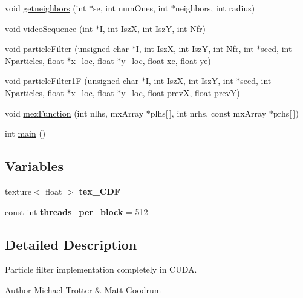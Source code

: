 \begin{DoxyCompactItemize}
\item 
void \hyperlink{ex__particle__CUDA__float_8cu_a0c00166a71eba29cbfd8caf24c68c0d5}{getneighbors} (int $\ast$se, int numOnes, int $\ast$neighbors, int radius)
\item 
void \hyperlink{ex__particle__CUDA__float_8cu_a675031ba0ebec137152999f4d153261e}{videoSequence} (int $\ast$I, int IszX, int IszY, int Nfr)
\item 
void \hyperlink{ex__particle__CUDA__float_8cu_a05ed124716b895cf81222aee197d181d}{particleFilter} (unsigned char $\ast$I, int IszX, int IszY, int Nfr, int $\ast$seed, int Nparticles, float $\ast$x\_\-loc, float $\ast$y\_\-loc, float xe, float ye)
\item 
void \hyperlink{ex__particle__CUDA__float_8cu_a6974c54bae46bd8f7e20eb89a5c73189}{particleFilter1F} (unsigned char $\ast$I, int IszX, int IszY, int $\ast$seed, int Nparticles, float $\ast$x\_\-loc, float $\ast$y\_\-loc, float prevX, float prevY)
\item 
void \hyperlink{ex__particle__CUDA__float_8cu_a6a215cbfde54f82a3ce599228fc3fce5}{mexFunction} (int nlhs, mxArray $\ast$plhs\mbox{[}$\,$\mbox{]}, int nrhs, const mxArray $\ast$prhs\mbox{[}$\,$\mbox{]})
\item 
int \hyperlink{ex__particle__CUDA__float_8cu_ae66f6b31b5ad750f1fe042a706a4e3d4}{main} ()
\end{DoxyCompactItemize}
\subsection*{Variables}
\begin{DoxyCompactItemize}
\item 
\hypertarget{ex__particle__CUDA__float_8cu_aedc3290963bb805decfdc11eebb7622a}{
texture$<$ float $>$ {\bfseries tex\_\-CDF}}
\label{ex__particle__CUDA__float_8cu_aedc3290963bb805decfdc11eebb7622a}

\item 
\hypertarget{ex__particle__CUDA__float_8cu_ac1fd9bf7fbbc3bd648ba96689efd1982}{
const int {\bfseries threads\_\-per\_\-block} = 512}
\label{ex__particle__CUDA__float_8cu_ac1fd9bf7fbbc3bd648ba96689efd1982}

\end{DoxyCompactItemize}


\subsection{Detailed Description}
Particle filter implementation completely in CUDA. \begin{DoxyAuthor}{Author}
Michael Trotter \& Matt Goodrum 
\end{DoxyAuthor}



